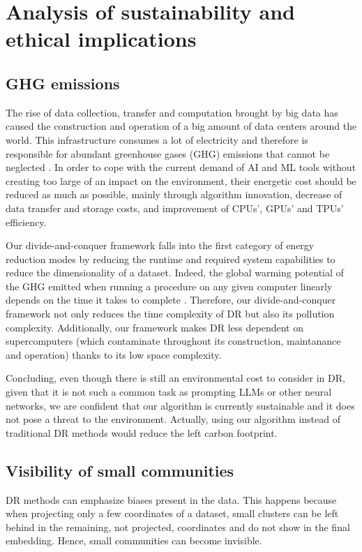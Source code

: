 \section{Analysis of sustainability and ethical implications}

\subsection{GHG emissions}

The rise of data collection, transfer and computation brought by big data has caused the construction and operation of a big amount of data centers around the world. This infrastructure consumes a lot of electricity and therefore is responsible for abundant greenhouse gases (GHG) emissions that cannot be neglected \citep{IEA2025, Brierley2023}. In order to cope with the current demand of AI and ML tools without creating too large of an impact on the environment, their energetic cost should be reduced as much as possible, mainly through algorithm innovation, decrease of data transfer and storage costs, and improvement of CPUs', GPUs' and TPUs' efficiency.

Our divide-and-conquer framework falls into the first category of energy reduction modes by reducing the runtime and required system capabilities to reduce the dimensionality of a dataset. Indeed, the global warming potential of the GHG emitted when running a procedure on any given computer linearly depends on the time it takes to complete \citep{Lannelongue2021}. Therefore, our divide-and-conquer framework not only reduces the time complexity of DR but also its pollution complexity. Additionally, our framework makes DR less dependent on supercomputers (which contaminate throughout its construction, maintanance and operation) thanks to its low space complexity.

Concluding, even though there is still an environmental cost to consider in DR, given that it is not such a common task as prompting LLMs or other neural networks, we are confident that our algorithm is currently sustainable and it does not pose a threat to the environment. Actually, using our algorithm instead of traditional DR methods would reduce the left carbon footprint.

\subsection{Visibility of small communities}

DR methods can emphasize biases present in the data. This happens because when projecting only a few coordinates of a dataset, small clusters can be left behind in the remaining, not projected, coordinates and do not show in the final embedding. Hence, small communities can become invisible.

